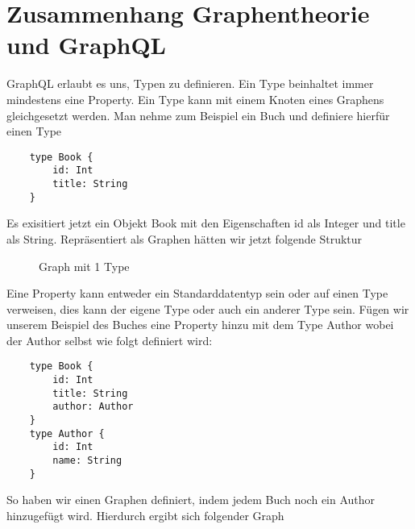 \section{Zusammenhang Graphentheorie und GraphQL}

GraphQL erlaubt es uns, Typen zu definieren. Ein Type beinhaltet immer mindestens eine Property. Ein Type kann mit einem
Knoten eines Graphens gleichgesetzt werden. Man nehme zum Beispiel ein Buch und definiere hierfür einen Type

\begin{verbatim}
    type Book {
        id: Int
        title: String
    }
\end{verbatim}

Es exisitiert jetzt ein Objekt Book mit den Eigenschaften id als Integer und title als String.
Repräsentiert als Graphen hätten wir jetzt folgende Struktur

\begin{figure}[!htbp]
    \begin{center}
    \caption{Graph mit 1 Type}
    \end{center}
    \label{fig:1type}
\end{figure}

Eine Property kann entweder ein Standarddatentyp sein oder auf einen Type verweisen, dies kann der eigene Type oder auch
ein anderer Type sein. Fügen wir unserem Beispiel des Buches eine Property hinzu mit dem Type Author wobei der Author selbst
wie folgt definiert wird:

\begin{verbatim}
    type Book {
        id: Int
        title: String
        author: Author
    }
    type Author {
        id: Int
        name: String
    }
\end{verbatim}

So haben wir einen Graphen definiert, indem jedem Buch noch ein Author hinzugefügt wird. Hierdurch ergibt sich folgender Graph

